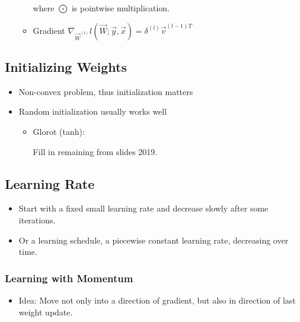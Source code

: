 \documentclass[10pt,a4paper]{scrartcl}
\begin{document}
\begin{multicols*}{2}
\begin{enumerate}
\begin{itemize}
where $\bigodot$ is pointwise multiplication.
\item Gradient $\nabla_{\vec{W}^{(l)}}l(\vec{W};\vec{y},\vec{x})=\delta^{(l)}\vec{v}^{(l-1)T}$
\end{itemize}
\end{enumerate}

\subsection{Initializing Weights}

\begin{itemize}
\item Non-convex problem, thus initialization matters
\item Random initialization usually works well
\begin{itemize}
\item Glorot (tanh): 

Fill in remaining from slides 2019.
\end{itemize}
\end{itemize}

\subsection{Learning Rate}


\begin{itemize}
\item Start with a fixed small learning rate and decrease slowly after some iterations.
\item Or a learning schedule, a piecewise constant learning rate, decreasing over time.
\end{itemize}

\subsubsection{Learning with Momentum}

\begin{itemize}
\item Idea: Move not only into a direction of gradient, but also in direction of last weight update.


\end{itemize}
\end{multicols*}
\end{document}
